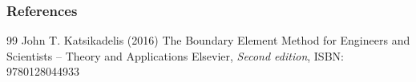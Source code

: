 \documentclass[10pt,xcolor=pdftex,dvipsnames,table]{beamer}
\begin{document}

\begin{frame}
	\frametitle{References}
	\footnotesize{
		\begin{thebibliography}{99} %
			 John T. Katsikadelis (2016)
			\newblock The Boundary Element Method for Engineers and Scientists -- Theory and Applications
			\newblock Elsevier, \emph{Second edition}, ISBN: 9780128044933
		\end{thebibliography}
	}
\end{frame}
\end{document}
